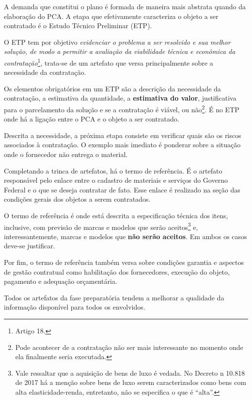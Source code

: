 A demanda que constitui o plano é formada de maneira mais abstrata quando da elaboração do PCA. A etapa que efetivamente caracteriza o objeto a ser contratado é o Estudo Técnico Preliminar (ETP).

O ETP tem por objetivo \emph{evidenciar o problema a ser resolvido e sua melhor solução, de modo a permitir a avaliação da viabilidade técnica e econômica da contratação}\footnote{Artigo 18.}, trata-se de um artefato que versa principalmente sobre a necessidade da contratação.

Os elementos obrigatórios em um ETP são a descrição da necessidade da contratação, a estimativa da quantidade, a \textbf{estimativa do valor}, justificativa para o parcelamento da solução e se a contratação é viável, ou não\footnote{Pode acontecer de a contratação não ser mais interessante no momento onde ela finalmente seria executada.}. É no ETP onde há a ligação entre o PCA e o objeto a ser contratado.

Descrita a necessidade, a próxima etapa consiste em verificar quais são os riscos associados à contratação. O exemplo mais imediato é ponderar sobre a situação onde o fornecedor não entrega o material.

Completando a trinca de artefatos, há o termo de referência. É o artefato responsável pelo enlace entre o cadastro de materiais e serviços do Governo Federal e o que se deseja contratar de fato. Esse enlace é realizado na seção das condições gerais dos objetos a serem contratados.

O termo de referência é onde está descrita a especificação técnica dos itens, inclusive, com previsão de marcas e modelos que serão aceitos\footnote{Vale ressaltar que a aquisição de bens de luxo é vedada. No Decreto n{\textordmasculine} 10.818 de 2017 há a menção sobre bens de luxo serem caracterizados como bens com alta elasticidade-renda, entretanto, não se especifica o que é ``alta''.} e, interessantemente, marcas e modelos que \textbf{não serão aceitos}. Em ambos os casos deve-se justificar.

Por fim, o termo de referência também versa sobre condições garantia e aspectos de gestão contratual como habilitação dos fornecedores, execução do objeto, pagamento e adequação orçamentária.

Todos os artefatos da fase preparatória tendem a melhorar a qualidade da informação disponível para todos os envolvidos.

